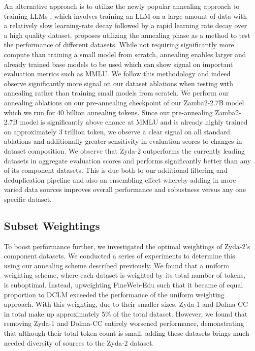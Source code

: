 \documentclass[conference]{IEEEtran}
\begin{document}
An alternative approach is to utilize the newly popular annealing approach to training LLMs \citep{hu2024minicpm,parmar2024nemotron,glorioso2024zamba}, which involves training an LLM on a large amount of data with a relatively slow learning-rate decay followed by a rapid learning rate decay over a high quality dataset. \citet{blakeney2024does} proposes utilizing the annealing phase as a method to test the performance of different datasets. While not requiring significantly more compute than training a small model from scratch, annealing enables larger and already trained base models to be used which can show signal on important evaluation metrics such as MMLU. We follow this methodology and indeed observe significantly more signal on our dataset ablations when testing with annealing rather than training small models from scratch. We perform our annealing ablations on our pre-annealing checkpoint of our Zamba2-2.7B model \cite{glorioso2024zamba2} which we run for 40 billion annealing tokens. Since our pre-annealing Zamba2-2.7B model is significantly above chance at MMLU and is already highly trained on approximately 3 trillion token, we observe a clear signal on all standard ablations and additionally greater sensitivity in evaluation scores to changes in dataset composition. We observe that Zyda-2 outperforms the currently leading datasets in aggregate evaluation scores and performs significantly better than any of its component datasets. This is due both to our additional filtering and deduplication pipeline and also an ensembling effect whereby adding in more varied data sources improves overall performance and robustness versus any one specific dataset.

\subsection{Subset Weightings}

To boost performance further, we investigated the optimal weightings of Zyda-2's component datasets. We conducted a series of experiments to determine this using our annealing scheme described previously. We found that a uniform weighting scheme, where each dataset is weighted by its total number of tokens, is suboptimal. Instead, upweighting FineWeb-Edu such that it became of equal proportion to DCLM exceeded the performance of the uniform weighting approach. With this weighting, due to their smaller sizes, Zyda-1 and Dolma-CC in total make up approximately 5\% of the total dataset. However, we found that removing Zyda-1 and Dolma-CC entirely worsened performance, demonstrating that although their total token count is small, adding these datasets brings much-needed diversity of sources to the Zyda-2 dataset.
\end{document}
